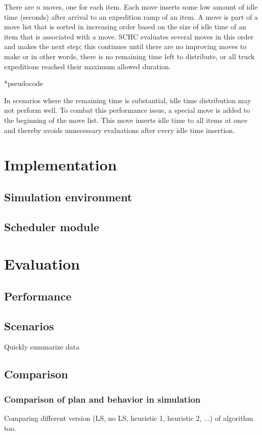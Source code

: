 \documentclass{ctuthesis}
\begin{document}
There are $n$ moves, one for each item. Each move inserts some low amount of idle time (seconds) after arrival to an expedition ramp of an item. A move is part of a move list that is sorted in increasing order based on the size of idle time of an item that is associated with a move. SCHC evaluates several moves in this order and makes the next step; this continues until there are no improving moves to make or in other words, there is no remaining time left to distribute, or all truck expeditions reached their maximum allowed duration.

*pseudocode

In scenarios where the remaining time is substantial, idle time distribution may not perform well. To combat this performance issue, a special move is added to the beginning of the move list. This move inserts idle time to all items at once and thereby avoids unnecessary evaluations after every idle time insertion.

\chapter{Implementation}
\section{Simulation environment}
\section{Scheduler module}
\chapter{Evaluation}
\label{ch:Evaluation}
\section{Performance}
\section{Scenarios}
Quickly summarize data 
\section{Comparison}
\subsection{Comparison of plan and behavior in simulation}
Comparing different version (LS, no LS, heuristic 1, heuristic 2, ...) of algorithm too.
\end{document}
